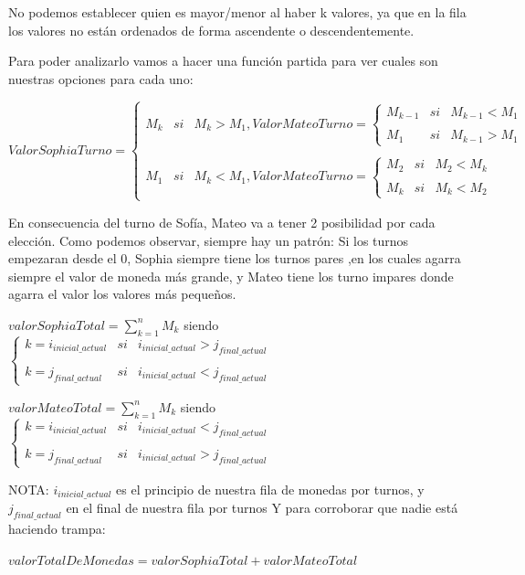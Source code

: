 No podemos establecer quien es mayor/menor al haber k valores, ya que en la fila los valores no están ordenados de forma ascendente o descendentemente.

Para poder analizarlo vamos a hacer una función partida para ver cuales son nuestras opciones para cada uno:

$ValorSophiaTurno= \left\{ \begin{array}{lcc} M_{k} & si & M_{k}>M_{1} , ValorMateoTurno= \left\{ \begin{array}{lcc} M_{k-1} & si & M_{k-1}<M_{1} \\ \\ M_{1} & si & M_{k-1} > M_{1} \end{array} \right. \\ \\ M_{1} & si & M_{k} < M_{1}, ValorMateoTurno= \left\{ \begin{array}{lcc} M_{2} & si & M_{2}<M_{k} \\ \\ M_{k} & si & M_{k} < M_{2} \end{array} \right. \end{array} \right.$

En consecuencia del turno de Sofía, Mateo va a tener 2 posibilidad por cada elección.
\vskip1cm
Como podemos observar, siempre hay un patrón: Si los turnos empezaran desde el 0, Sophia siempre tiene los turnos pares
,en los cuales agarra siempre el valor de moneda más grande, y Mateo tiene los turno impares donde agarra el valor los valores más pequeños.

\vskip0.5cm

\vskip0.5cm
$valorSophiaTotal =  \sum_{k=1}^{n}M_{k}$ siendo $\left\{ \begin{array}{lcc} k=i_{inicial\_actual} & si & i_{inicial\_actual}>j_{final\_actual} \\ \\ k=j_{final\_actual} & si & i_{inicial\_actual}<j_{final\_actual} \end{array} \right.$

\vskip0.5cm
$valorMateoTotal =  \sum_{k=1}^{n}M_{k}$ siendo $\left\{ \begin{array}{lcc} k=i_{inicial\_actual} & si & i_{inicial\_actual}<j_{final\_actual} \\ \\ k=j_{final\_actual} & si & i_{inicial\_actual}>j_{final\_actual} \end{array} \right.$

\vskip0.5cm
NOTA: $i_{inicial\_actual}$ es el principio de nuestra fila de monedas por turnos, y $j_{final\_actual}$ en el final de nuestra fila por turnos 
\vskip1cm
Y para corroborar que nadie está haciendo trampa:
\vskip0.5cm
\begin{center}
    $valorTotalDeMonedas=valorSophiaTotal+valorMateoTotal$
\end{center}


